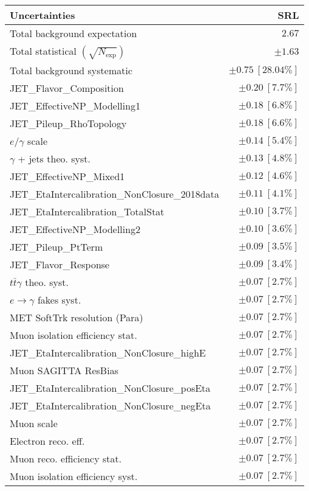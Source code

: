 \begin{tabular}{lr}
\hline
\textbf{Uncertainties} & \textbf{SRL} \\
\hline
Total background expectation & $2.67$ \\
\hline
Total statistical $(\sqrt{N_\mathrm{exp}})$ & $\pm 1.63$ \\
Total background systematic & $\pm 0.75\ [28.04\%]$ \\
\hline
\hline
JET\_Flavor\_Composition & $\pm 0.20\ [7.7\%]$ \\
JET\_EffectiveNP\_Modelling1 & $\pm 0.18\ [6.8\%]$ \\
JET\_Pileup\_RhoTopology & $\pm 0.18\ [6.6\%]$ \\
$e/\gamma$ scale & $\pm 0.14\ [5.4\%]$ \\
$\gamma$ + jets theo. syst. & $\pm 0.13\ [4.8\%]$ \\
JET\_EffectiveNP\_Mixed1 & $\pm 0.12\ [4.6\%]$ \\
JET\_EtaIntercalibration\_NonClosure\_2018data & $\pm 0.11\ [4.1\%]$ \\
JET\_EtaIntercalibration\_TotalStat & $\pm 0.10\ [3.7\%]$ \\
JET\_EffectiveNP\_Modelling2 & $\pm 0.10\ [3.6\%]$ \\
JET\_Pileup\_PtTerm & $\pm 0.09\ [3.5\%]$ \\
JET\_Flavor\_Response & $\pm 0.09\ [3.4\%]$ \\
$t\bar{t}\gamma$ theo. syst. & $\pm 0.07\ [2.7\%]$ \\
$e\to\gamma$ fakes syst. & $\pm 0.07\ [2.7\%]$ \\
MET SoftTrk resolution (Para) & $\pm 0.07\ [2.7\%]$ \\
Muon isolation efficiency stat. & $\pm 0.07\ [2.7\%]$ \\
JET\_EtaIntercalibration\_NonClosure\_highE & $\pm 0.07\ [2.7\%]$ \\
Muon SAGITTA ResBias & $\pm 0.07\ [2.7\%]$ \\
JET\_EtaIntercalibration\_NonClosure\_posEta & $\pm 0.07\ [2.7\%]$ \\
JET\_EtaIntercalibration\_NonClosure\_negEta & $\pm 0.07\ [2.7\%]$ \\
Muon scale & $\pm 0.07\ [2.7\%]$ \\
Electron reco. eff. & $\pm 0.07\ [2.7\%]$ \\
Muon reco. efficiency stat. & $\pm 0.07\ [2.7\%]$ \\
Muon isolation efficiency syst. & $\pm 0.07\ [2.7\%]$ \\

\end{tabular}
